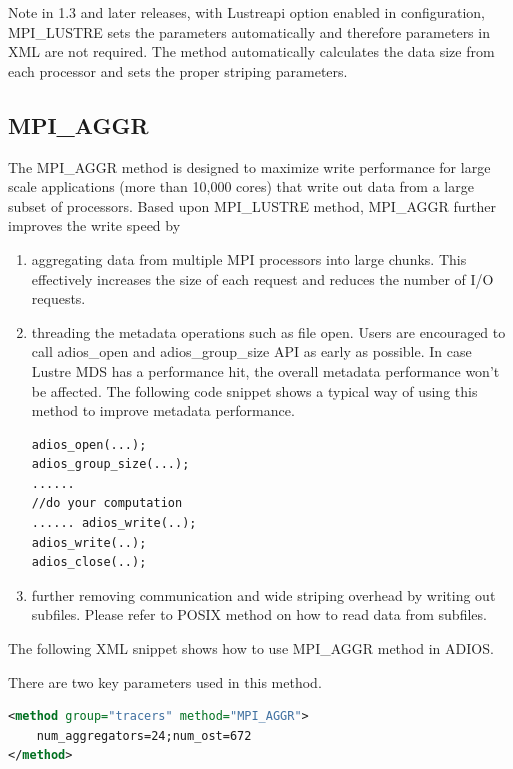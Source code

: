 Note in 1.3 and later releases, with Lustreapi option enabled in configuration, 
MPI\_LUSTRE sets the parameters automatically and therefore parameters in XML are 
not required.  The method automatically calculates the data size from each processor 
and sets the proper striping parameters. 

\subsection{MPI\_AGGR}
\label{section-method-mpiamr}

The MPI\_AGGR method is designed to maximize write performance for large scale
applications (more than 10,000 cores) that write out data from a large subset of
processors. 
Based upon MPI\_LUSTRE method, MPI\_AGGR further improves the write speed by 

\begin{enumerate}
\item aggregating data from multiple MPI processors into large chunks. This effectively 
increases the size of each request and reduces the number of I/O requests.
\item threading the metadata operations such as file open. Users are encouraged to 
call adios\_open and adios\_group\_size API as early as possible. In case Lustre 
MDS has a performance hit, the overall metadata performance won't be affected. 
The following code snippet shows a typical way of using this method to improve 
metadata performance.
\begin{lstlisting}[language=XML]
adios_open(...); 
adios_group_size(...);
...... 
//do your computation
...... adios_write(..); 
adios_write(..); 
adios_close(..);
\end{lstlisting}

\item further removing communication and wide striping overhead by writing out subfiles. 
Please refer to POSIX method on how to read data from subfiles.
\end{enumerate}

The following XML snippet shows how to use MPI\_AGGR method in ADIOS.

There are two key parameters used in this method.

\begin{lstlisting}[language=XML]
<method group="tracers" method="MPI_AGGR"> 
	num_aggregators=24;num_ost=672
</method>
\end{lstlisting}

